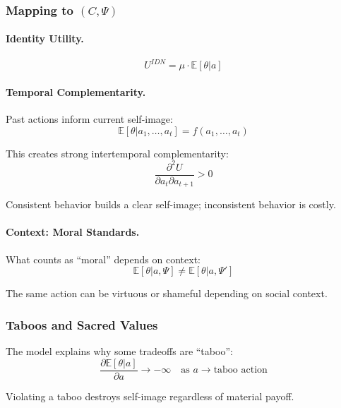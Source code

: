 \documentclass[12pt,a4paper]{article}
\begin{document}
\subsubsection{Mapping to $(C, \Psi)$}

\paragraph{Identity Utility.}
\begin{equation}
  U^{IDN} = \mu \cdot \mathbb{E}[\theta | a]
\end{equation}

\paragraph{Temporal Complementarity.}
Past actions inform current self-image:
\begin{equation}
  \mathbb{E}[\theta | a_1, \ldots, a_t] = f(a_1, \ldots, a_t)
\end{equation}

This creates strong intertemporal complementarity:
\begin{equation}
  \frac{\partial^2 U}{\partial a_t \partial a_{t+1}} > 0
\end{equation}

Consistent behavior builds a clear self-image; inconsistent behavior is costly.

\paragraph{Context: Moral Standards.}
What counts as ``moral'' depends on context:
\begin{equation}
  \mathbb{E}[\theta | a, \Psi] \neq \mathbb{E}[\theta | a, \Psi']
\end{equation}

The same action can be virtuous or shameful depending on social context.

\subsubsection{Taboos and Sacred Values}

The model explains why some tradeoffs are ``taboo'':
\begin{equation}
  \frac{\partial \mathbb{E}[\theta | a]}{\partial a} \to -\infty
  \quad \text{as } a \to \text{taboo action}
\end{equation}

Violating a taboo destroys self-image regardless of material payoff.
\end{document}
